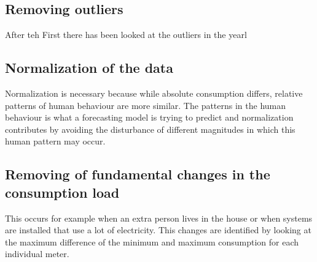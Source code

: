 \subsection{Removing outliers}
After teh 
First there has been looked at the outliers in the yearl




 


\subsection{Normalization of the data}
Normalization is necessary because while absolute consumption differs, relative patterns of human behaviour are more similar.\cite{Lago2020} The patterns in the human behaviour is what a forecasting model is trying to predict and normalization contributes by avoiding the disturbance of different magnitudes in which this human pattern may occur.  

\subsection{Removing of fundamental changes in the consumption load}  
This occurs for example when an extra person lives in the house or when systems are installed that use a lot of electricity.
This changes are identified by looking at the maximum difference of the minimum and maximum consumption for each individual meter.



